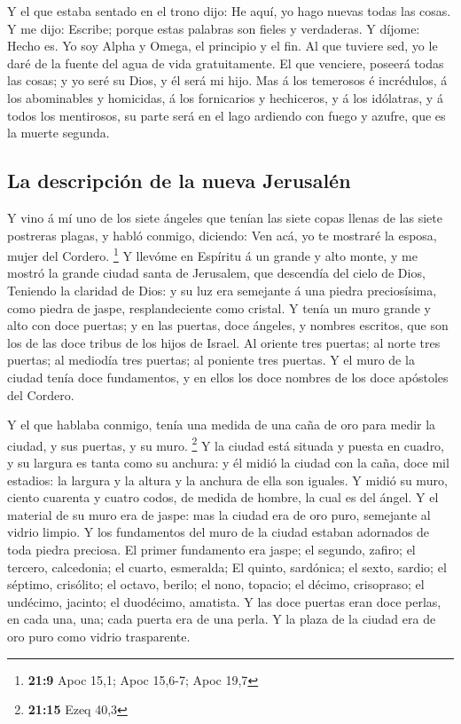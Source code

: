  Y el que estaba sentado en el trono dijo: He aquí, yo hago
nuevas todas las cosas. Y me dijo: Escribe; porque estas palabras son
fieles y verdaderas.  Y díjome: Hecho es. Yo soy Alpha y
Omega, el principio y el fin. Al que tuviere sed, yo le daré de la
fuente del agua de vida gratuitamente.  El que venciere,
poseerá todas las cosas; y yo seré su Dios, y él será mi hijo.
 Mas á los temerosos é incrédulos, á los abominables y
homicidas, á los fornicarios y hechiceros, y á los idólatras, y á todos
los mentirosos, su parte será en el lago ardiendo con fuego y azufre,
que es la muerte segunda.

\hypertarget{la-descripciuxf3n-de-la-nueva-jerusaluxe9n}{%
\subsection{La descripción de la nueva
Jerusalén}\label{la-descripciuxf3n-de-la-nueva-jerusaluxe9n}}

 Y vino á mí uno de los siete ángeles que tenían las siete
copas llenas de las siete postreras plagas, y habló conmigo, diciendo:
Ven acá, yo te mostraré la esposa, mujer del Cordero. \footnote{\textbf{21:9}
  Apoc 15,1; Apoc 15,6-7; Apoc 19,7}  Y llevóme en Espíritu
á un grande y alto monte, y me mostró la grande ciudad santa de
Jerusalem, que descendía del cielo de Dios,  Teniendo la
claridad de Dios: y su luz era semejante á una piedra preciosísima, como
piedra de jaspe, resplandeciente como cristal.  Y tenía un
muro grande y alto con doce puertas; y en las puertas, doce ángeles, y
nombres escritos, que son los de las doce tribus de los hijos de Israel.
 Al oriente tres puertas; al norte tres puertas; al
mediodía tres puertas; al poniente tres puertas.  Y el muro
de la ciudad tenía doce fundamentos, y en ellos los doce nombres de los
doce apóstoles del Cordero.

 Y el que hablaba conmigo, tenía una medida de una caña de
oro para medir la ciudad, y sus puertas, y su muro. \footnote{\textbf{21:15}
  Ezeq 40,3}  Y la ciudad está situada y puesta en cuadro,
y su largura es tanta como su anchura: y él midió la ciudad con la caña,
doce mil estadios: la largura y la altura y la anchura de ella son
iguales.  Y midió su muro, ciento cuarenta y cuatro codos,
de medida de hombre, la cual es del ángel.  Y el material
de su muro era de jaspe: mas la ciudad era de oro puro, semejante al
vidrio limpio.  Y los fundamentos del muro de la ciudad
estaban adornados de toda piedra preciosa. El primer fundamento era
jaspe; el segundo, zafiro; el tercero, calcedonia; el cuarto, esmeralda;
 El quinto, sardónica; el sexto, sardio; el séptimo,
crisólito; el octavo, berilo; el nono, topacio; el décimo, crisopraso;
el undécimo, jacinto; el duodécimo, amatista.  Y las doce
puertas eran doce perlas, en cada una, una; cada puerta era de una
perla. Y la plaza de la ciudad era de oro puro como vidrio trasparente.

